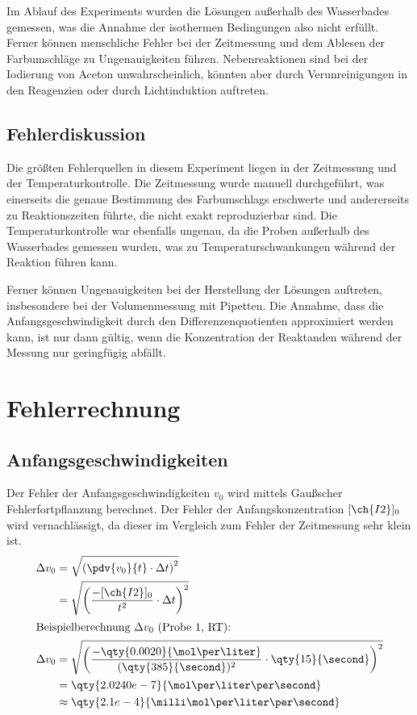Im Ablauf des Experiments wurden die Lösungen außerhalb des Wasserbades gemessen, was die Annahme der isothermen Bedingungen also nicht erfüllt.
Ferner können menschliche Fehler bei der Zeitmessung und dem Ablesen der Farbumschläge zu Ungenauigkeiten führen.
Nebenreaktionen sind bei der Iodierung von Aceton unwahrscheinlich, könnten aber durch Verunreinigungen in den Reagenzien oder durch Lichtinduktion auftreten.

\subsection{Fehlerdiskussion}
Die größten Fehlerquellen in diesem Experiment liegen in der Zeitmessung und der Temperaturkontrolle.
Die Zeitmessung wurde manuell durchgeführt, was einerseits die genaue Bestimmung des Farbumschlags erschwerte und andererseits zu Reaktionszeiten führte, die nicht exakt reproduzierbar sind.
Die Temperaturkontrolle war ebenfalls ungenau, da die Proben außerhalb des Wasserbades gemessen wurden, was zu Temperaturschwankungen während der Reaktion führen kann.

Ferner können Ungenauigkeiten bei der Herstellung der Lösungen auftreten, insbesondere bei der Volumenmessung mit Pipetten.
Die Annahme, dass die Anfangsgeschwindigkeit durch den Differenzenquotienten approximiert werden kann, ist nur dann gültig, wenn die Konzentration der Reaktanden während der Messung nur geringfügig abfällt.

\newpage
\printbibliography
\newpage
\appendix

\section{Fehlerrechnung}
\subsection{Anfangsgeschwindigkeiten}
Der Fehler der Anfangsgeschwindigkeiten $v_0$ wird mittels Gaußscher Fehlerfortpflanzung berechnet.
Der Fehler der Anfangskonzentration $[\ch{I2}]_0$ wird vernachlässigt, da dieser im Vergleich zum Fehler der Zeitmessung sehr klein ist.
\begin{align*}
    \Delta v_0 &= \sqrt{\left( \pdv{v_0}{t} \cdot \Delta t \right)^2} \\
                &= \sqrt{\left( \frac{-[\ch{I2}]_0}{t^2} \cdot \Delta t \right)^2} \\
    \intertext{Beispielberechnung $\Delta v_0$ (Probe 1, RT):}
    \Delta v_0 &= \sqrt{\left( \frac{-\qty{0.0020}{\mol\per\liter}}{(\qty{385}{\second})^2} \cdot \qty{15}{\second} \right)^2} \\
               &= \qty{2.0240e-7}{\mol\per\liter\per\second} \\
               &\approx \qty{2.1e-4}{\milli\mol\per\liter\per\second}
\end{align*}

